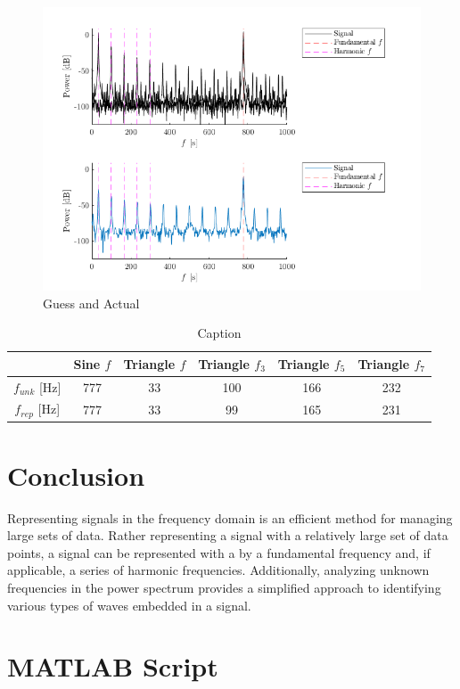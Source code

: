 \documentclass[letterpaper,12pt]{article}
\begin{document}
\begin{figure}[ht]
    \centering
    \includegraphics[width=.8\linewidth]{mysteryLab.png}
    \caption{Guess and Actual}
    \label{GuessActual}
\end{figure}

\begin{table}[ht]
    \centering
    \begin{tabular}{c|c||c|c|c|c}
         & Sine $f$ & Triangle $f$ & Triangle $f_3$ & Triangle $f_5$ & Triangle $f_7$ \\ \hline
         $f_{unk}$ [Hz] & 777  & 33  & 100 & 166 & 232\\ \hline
         $f_{rep}$ [Hz] & 777  & 33  & 99  & 165 & 231\\ 
    \end{tabular}
    \caption{Caption}
    \label{unknownSignalTable}
\end{table}

\section{Conclusion}
Representing signals in the frequency domain is an efficient method for managing large sets of data. Rather representing a signal with a relatively large set of data points, a signal can be represented with a by a fundamental frequency and, if applicable, a series of harmonic frequencies. Additionally, analyzing unknown frequencies in the power spectrum provides a simplified approach to identifying various types of waves embedded in a signal.

\newpage
\appendix

\section{MATLAB Script}

\end{document}
